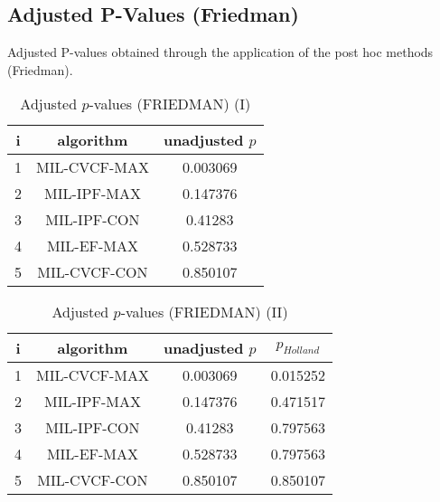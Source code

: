 \documentclass[a4paper,10pt]{article}
\begin{document}
\begin{landscape}
\newpage

\section{Adjusted P-Values (Friedman)}


Adjusted P-values obtained through the application of the post hoc methods (Friedman).

\begin{table}[!htp]
\centering\small
\begin{tabular}{ccc}
i&algorithm&unadjusted $p$\\
\hline1&MIL-CVCF-MAX&0.003069\\2&MIL-IPF-MAX&0.147376\\3&MIL-IPF-CON&0.41283\\4&MIL-EF-MAX&0.528733\\5&MIL-CVCF-CON&0.850107\\\hline
\end{tabular}
\caption{Adjusted $p$-values (FRIEDMAN) (I)}
\end{table}
\begin{table}[!htp]
\centering\small
\begin{tabular}{cccc}
i&algorithm&unadjusted $p$&$p_{Holland}$\\
\hline1&MIL-CVCF-MAX&0.003069&0.015252\\2&MIL-IPF-MAX&0.147376&0.471517\\3&MIL-IPF-CON&0.41283&0.797563\\4&MIL-EF-MAX&0.528733&0.797563\\5&MIL-CVCF-CON&0.850107&0.850107\\\hline
\end{tabular}
\caption{Adjusted $p$-values (FRIEDMAN) (II)}
\end{table}

\newpage
\end{landscape}
\end{document}
